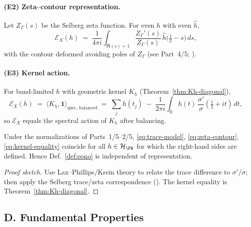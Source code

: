\paragraph{(E2) Zeta–contour representation.}
Let $Z_\Gamma(s)$ be the Selberg zeta function. For even $h$ with even $\hat h$,
\begin{equation}
\label{eq:zeta-contour}
  \mathcal E_X(h)
  \;=\;
  \frac{1}{4\pi i}\int_{\Re(s)=1}\frac{Z_\Gamma'(s)}{Z_\Gamma(s)}\,\hat h\!\Big(\tfrac12 - s\Big)\,ds,
\end{equation}
with the contour deformed avoiding poles of $Z_\Gamma$ (see Part~4/5; \cite{Selberg1956,Hejhal1983}).

\paragraph{(E3) Kernel action.}
For band-limited $h$ with geometric kernel $K_h$ (Theorem~\ref{thm:Kh-diagonal}),
\begin{equation}
\label{eq:kernel-equality}
  \mathcal E_X(h) \;=\; \langle K_h, \mathbf 1\rangle_{\mathrm{spec,\,balanced}}
  \;=\; \sum_j h(t_j) \;-\; \frac{1}{2\pi i}\!\int_{\mathbb R} h(t)\,\frac{\sigma'}{\sigma}(\tfrac12+it)\,dt,
\end{equation}
so $\mathcal E_X$ equals the spectral action of $K_h$ after balancing.

\begin{proposition}[Equivalence of (E1)–(E3)]
\label{prop:equiv}
Under the normalizations of Parts~1/5–2/5, \eqref{eq:trace-model}, \eqref{eq:zeta-contour}, \eqref{eq:kernel-equality} coincide for all $h\in\mathcal H_{\PW}$ for which the right-hand sides are defined. Hence Def.~\ref{def:eono} is independent of representation.
\end{proposition}

\begin{proof}[Proof sketch]
Use Lax–Phillips/Krein theory to relate the trace difference to $\sigma'/\sigma$; then apply the Selberg trace/zeta correspondence (\cite{Hejhal1983,Hejhal1983II}). The kernel equality is Theorem~\ref{thm:Kh-diagonal}.
\end{proof}


\subsection*{D. Fundamental Properties}
\label{subsec:properties}

